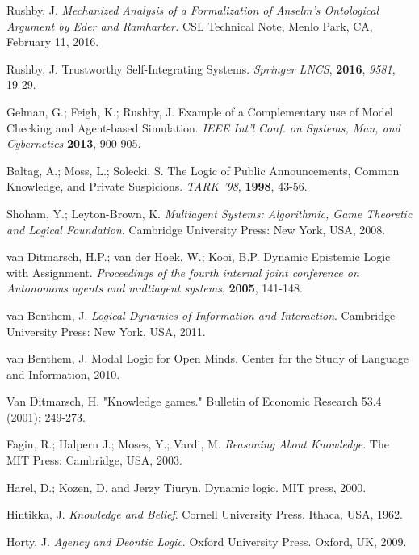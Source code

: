 \begin{thebibliography}{9}
	 	Rushby, J. {\em Mechanized Analysis of a Formalization of Anselm's Ontological Argument by Eder and Ramharter.} CSL Technical Note, Menlo Park, CA, February 11, 2016.
	 	
	 	Rushby, J. Trustworthy Self-Integrating Systems. {\em Springer LNCS}, {\bf 2016}, {\em 9581}, 19-29.
	 	
	 	Gelman, G.; Feigh, K.; Rushby, J. Example of a Complementary use of Model Checking and Agent-based Simulation. {\em IEEE Int'l Conf. on Systems, Man, and Cybernetics} {\bf 2013}, 900-905.
	 	
	 	
	 	
	 	Baltag, A.; Moss, L.; Solecki, S. The Logic of Public Announcements, Common Knowledge, and Private Suspicions. {\em TARK '98}, {\bf 1998}, 43-56.
	 	
	 	Shoham, Y.; Leyton-Brown, K. {\em Multiagent Systems: Algorithmic, Game Theoretic and Logical Foundation}. Cambridge University Press: New York, USA, 2008.
	 	
	 	van Ditmarsch, H.P.; van der Hoek, W.; Kooi, B.P. Dynamic Epistemic Logic with Assignment. {\em Proceedings of the fourth internal joint conference on Autonomous agents and multiagent systems}, {\bf 2005}, 141-148.
	 	
	 	van Benthem, J. {\em Logical Dynamics of Information and Interaction}. Cambridge University Press: New York, USA, 2011.
	 	
	 	van Benthem, J. Modal Logic for Open Minds. Center for the Study of Language and Information, 2010.
	 	
	 	Van Ditmarsch, H. "Knowledge games." Bulletin of Economic Research 53.4 (2001): 249-273.
	 	
	 	Fagin, R.; Halpern J.; Moses, Y.; Vardi, M. {\em Reasoning About Knowledge}. The MIT Press: Cambridge, USA, 2003.
	 	
	 	Harel, D.; Kozen, D. and Jerzy Tiuryn. Dynamic logic. MIT press, 2000.
	 	
	 	Hintikka, J. {\em Knowledge and Belief}. Cornell University Press. Ithaca, USA, 1962.
	 	
	 	Horty, J. {\em Agency and Deontic Logic}. Oxford University Press. Oxford, UK, 2009.
	 	

\end{thebibliography}
